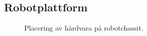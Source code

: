 \documentclass[a4paper,11pt]{article}
\begin{document}
\begin{appendices}
\section{Robotplattform}
\label{app:placement}
\begin{figure}[h!]
    \caption{Placering av hårdvara på robotchassit.}
    \label{fig:placement}
\end{figure}
\end{appendices}

\clearpage
{} %
\printbibliography
\end{document}
